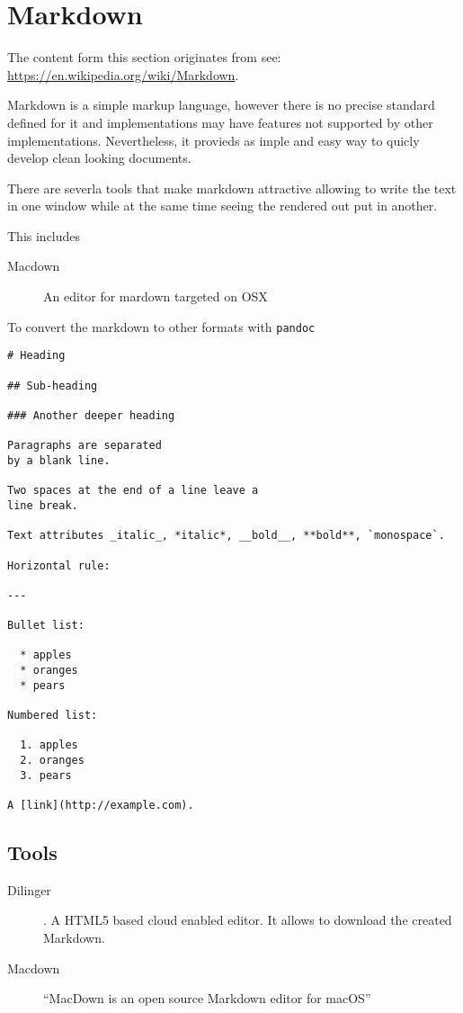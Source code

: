 \FILENAME

\section{Markdown}\label{markdown}

The content form this section originates from see:
\url{https://en.wikipedia.org/wiki/Markdown}.

Markdown is a simple markup language, however there is no precise
standard defined for it and implementations may have features not
supported by other implementations. Nevertheless, it provieds as imple
and easy way to quicly develop clean looking documents.

There are severla tools that make markdown attractive allowing to
write the text in one window while at the same time seeing the
rendered out put in another.

This includes

\begin{description}

\item[Macdown] An editor for mardown targeted on OSX

\end{description}

To convert the markdown to other formats with \verb|pandoc|

\begin{verbatim}
# Heading

## Sub-heading

### Another deeper heading
 
Paragraphs are separated
by a blank line.

Two spaces at the end of a line leave a  
line break.

Text attributes _italic_, *italic*, __bold__, **bold**, `monospace`.

Horizontal rule:

---

Bullet list:

  * apples
  * oranges
  * pears

Numbered list:

  1. apples
  2. oranges
  3. pears

A [link](http://example.com).

\end{verbatim}

\subsection{Tools}

\begin{description}
\item [Dilinger] . A HTML5 based cloud
  enabled editor. It allows to download the created Markdown.
\item[Macdown]  ``MacDown is an
  open source Markdown editor for macOS''
\end{description}